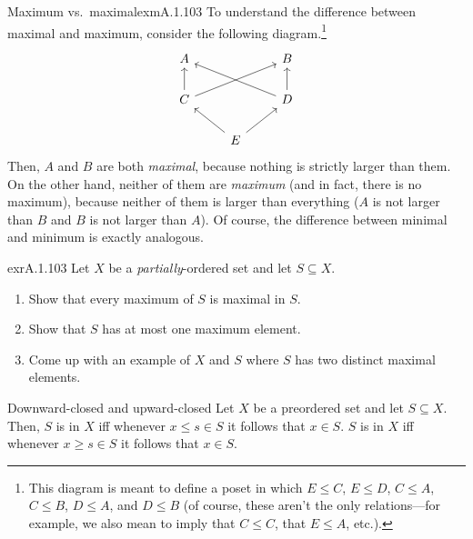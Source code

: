 \begin{exm}{Maximum vs.~maximal}{exmA.1.103}
To understand the difference between maximal and maximum, consider the following diagram.\footnote{This diagram is meant to define a poset in which $E\leq C$, $E\leq D$, $C\leq A$, $C\leq B$, $D\leq A$, and $D\leq B$ (of course, these aren't the only relations---for example, we also mean to imply that $C\leq C$, that $E\leq A$, etc.).}
\begin{equation}
\begin{tikzcd}
A & & B \\
C \ar[u] \ar[rru] & & D \ar[llu] \ar[u] \\
  & E \ar[lu] \ar[ru] &
\end{tikzcd}
\end{equation}
Then, $A$ and $B$ are both \emph{maximal}, because nothing is strictly larger than them.  On the other hand, neither of them are \emph{maximum} (and in fact, there is no maximum), because neither of them is larger than everything ($A$ is not larger than $B$ and $B$ is not larger than $A$).  Of course, the difference between minimal and minimum is exactly analogous.
\end{exm}
\begin{exr}{}{exrA.1.103}
Let $X$ be a \emph{partially}-ordered set and let $S\subseteq X$.
\begin{enumerate}
\item Show that every maximum of $S$ is maximal in $S$.
\item Show that $S$ has at most one maximum element.
\item Come up with an example of $X$ and $S$ where $S$ has two distinct maximal elements.
\end{enumerate}
\end{exr}
\begin{dfn}{Downward-closed and upward-closed}{}
Let $X$ be a preordered set and let $S\subseteq X$.  Then, $S$ is  in $X$ iff whenever $x\leq s\in S$ it follows that $x\in S$.  $S$ is  in $X$ iff whenever $x\geq s\in S$ it follows that $x\in S$.
\end{dfn}
